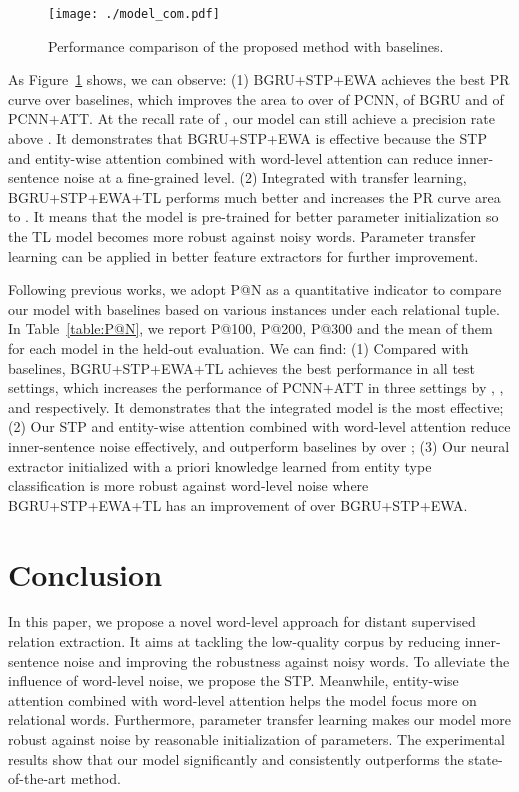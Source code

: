 \documentclass[11pt,a4paper]{article}
\begin{document}
  \begin{figure}[htbp]
    \centering
    \texttt{[image: ./model\_com.pdf]}
    \caption{Performance comparison of the proposed method with baselines.}
    \label{fig:model_com}
  \end{figure}

  As Figure~\ref{fig:model_com} shows, we can observe: (1) BGRU+STP+EWA achieves the best PR curve over baselines, which improves the area to  over  of PCNN,  of BGRU and  of PCNN+ATT. At the recall rate of , our model can still achieve a precision rate above . It demonstrates that BGRU+STP+EWA is effective because the STP and entity-wise attention combined with word-level attention can reduce inner-sentence noise at a fine-grained level. (2) Integrated with transfer learning, BGRU+STP+EWA+TL performs much better and increases the PR curve area to . It means that the model is pre-trained for better parameter initialization so the TL model becomes more robust against noisy words. Parameter transfer learning can be applied in better feature extractors for further improvement.

  Following previous works, we adopt P@N as a quantitative indicator to compare our model with baselines based on various instances under each relational tuple. In Table~\ref{table:P@N}, we report P@100, P@200, P@300 and the mean of them for each model in the held-out evaluation. We can find: (1) Compared with baselines, BGRU+STP+EWA+TL achieves the best performance in all test settings, which increases the performance of PCNN+ATT in three settings by , , and  respectively. It demonstrates that the integrated model is the most effective; (2) Our STP and entity-wise attention combined with word-level attention reduce inner-sentence noise effectively, and outperform baselines by over ; (3) Our neural extractor initialized with a priori knowledge learned from entity type classification is more robust against word-level noise where BGRU+STP+EWA+TL has an improvement of  over BGRU+STP+EWA.

\section{Conclusion}
  In this paper, we propose a novel word-level approach for distant supervised relation extraction. It aims at tackling the low-quality corpus by reducing inner-sentence noise and improving the robustness against noisy words. To alleviate the influence of word-level noise, we propose the STP. Meanwhile, entity-wise attention combined with word-level attention helps the model focus more on relational words. Furthermore, parameter transfer learning makes our model more robust against noise by reasonable initialization of parameters. The experimental results show that our model significantly and consistently outperforms the state-of-the-art method.
\end{document}
